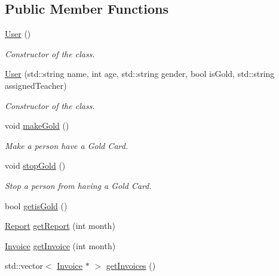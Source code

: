 \subsection*{Public Member Functions}
\begin{DoxyCompactItemize}
\item 
\mbox{\label{class_user_a4a0137053e591fbb79d9057dd7d2283d}} 
\mbox{\hyperlink{class_user_a4a0137053e591fbb79d9057dd7d2283d}{User}} ()
\begin{DoxyCompactList}\small\item\em Constructor of the class. \end{DoxyCompactList}\item 
\mbox{\hyperlink{class_user_a898c6748faa70dcd3d30e550be2eb768}{User}} (std\+::string name, int age, std\+::string gender, bool is\+Gold, std\+::string assigned\+Teacher)
\begin{DoxyCompactList}\small\item\em Constructor of the class. \end{DoxyCompactList}\item 
\mbox{\label{class_user_a1ddb4cbabc84ef92ac92bfe6f9385d39}} 
void \mbox{\hyperlink{class_user_a1ddb4cbabc84ef92ac92bfe6f9385d39}{make\+Gold}} ()
\begin{DoxyCompactList}\small\item\em Make a person have a Gold Card. \end{DoxyCompactList}\item 
\mbox{\label{class_user_a88a8b41f134b21aeb702c481ffee0ef4}} 
void \mbox{\hyperlink{class_user_a88a8b41f134b21aeb702c481ffee0ef4}{stop\+Gold}} ()
\begin{DoxyCompactList}\small\item\em Stop a person from having a Gold Card. \end{DoxyCompactList}\item 
bool \mbox{\hyperlink{class_user_ac1af1ded379bd2fd56f96f90348520fe}{getis\+Gold}} ()
\item 
\mbox{\hyperlink{class_report}{Report}} \mbox{\hyperlink{class_user_ad5f236ca0846ae3fc493609f72d17a70}{get\+Report}} (int month)
\item 
\mbox{\hyperlink{class_invoice}{Invoice}} \mbox{\hyperlink{class_user_a4fafb4511574972c6e7801f2bb6a638b}{get\+Invoice}} (int month)
\item 
std\+::vector$<$ \mbox{\hyperlink{class_invoice}{Invoice}} $\ast$ $>$ \mbox{\hyperlink{class_user_aeb297e5cd248e1e2c0ae3540cbedcca8}{get\+Invoices}} ()

\end{DoxyCompactItemize}
